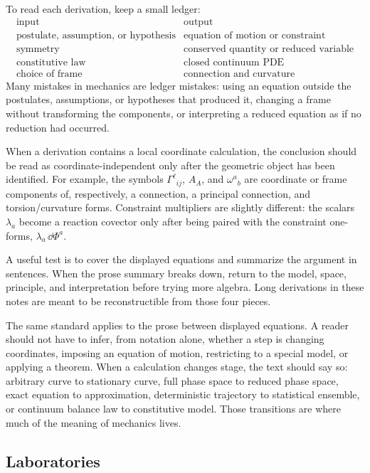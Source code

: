 To read each derivation, keep a small ledger:
\[
\begin{array}{c|c}
\text{input} & \text{output}\\
\hline
\text{postulate, assumption, or hypothesis} & \text{equation of motion or constraint}\\
\text{symmetry} & \text{conserved quantity or reduced variable}\\
\text{constitutive law} & \text{closed continuum PDE}\\
\text{choice of frame} & \text{connection and curvature}
\end{array}
\]
Many mistakes in mechanics are ledger mistakes: using an equation outside the
postulates, assumptions, or hypotheses that produced it, changing a frame
without transforming the components, or interpreting a reduced equation as if no
reduction had occurred.

When a derivation contains a local coordinate calculation, the conclusion should
be read as coordinate-independent only after the geometric object has been
identified. For example, the symbols \(\Gamma^\ell{}_{ij}\), \(A_A\), and
\(\omega^a{}_b\) are coordinate or frame components of, respectively, a
connection, a principal connection, and torsion/curvature forms. Constraint
multipliers are slightly different: the scalars \(\lambda_a\) become a
reaction covector only after being paired with the constraint one-forms,
\(\lambda_a\,\dd\Phi^a\).

A useful test is to cover the displayed equations and summarize the argument in
sentences. When the prose summary breaks down, return to the model, space,
principle, and interpretation before trying more algebra. Long derivations in
these notes are meant to be reconstructible from those four pieces.

The same standard applies to the prose between displayed equations. A reader
should not have to infer, from notation alone, whether a step is changing
coordinates, imposing an equation of motion, restricting to a special model,
or applying a theorem. When a calculation changes stage, the text should say
so: arbitrary curve to stationary curve, full phase space to reduced phase
space, exact equation to approximation, deterministic trajectory to statistical
ensemble, or continuum balance law to constitutive model. Those transitions are
where much of the meaning of mechanics lives.

\subsection*{Laboratories}
\label{sec:chapter-end-laboratories}

